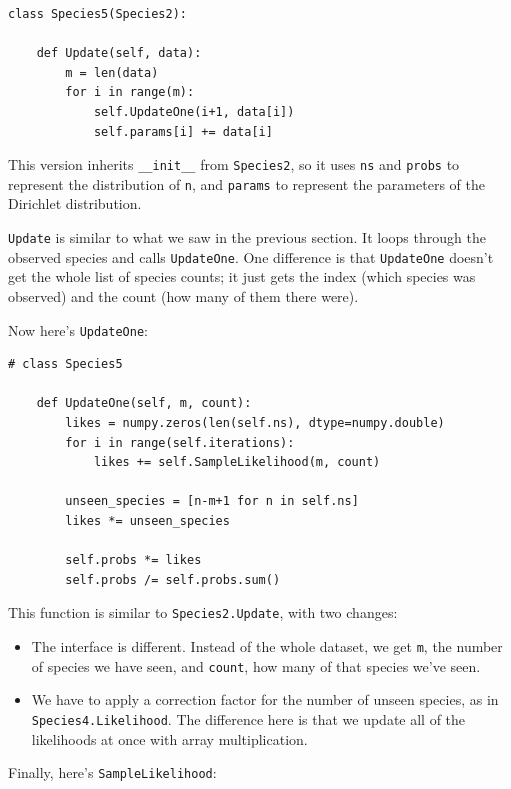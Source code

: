 \documentclass[12pt]{book}
\begin{document}
\begin{verbatim}
class Species5(Species2):
    
    def Update(self, data):
        m = len(data)
        for i in range(m):
            self.UpdateOne(i+1, data[i])
            self.params[i] += data[i]
\end{verbatim}

This version inherits \verb"__init__" from {\tt Species2}, so
it uses {\tt ns} and {\tt probs} to represent the distribution
of {\tt n}, and {\tt params} to represent the parameters of
the Dirichlet distribution.

{\tt Update} is similar to what we saw in the previous section.
It loops through the observed species and calls {\tt UpdateOne}.
One difference is that {\tt UpdateOne} doesn't get the whole list
of species counts; it just gets the index (which species was
observed) and the count (how many of them there were).

Now here's {\tt UpdateOne}:

\begin{verbatim}
# class Species5

    def UpdateOne(self, m, count):
        likes = numpy.zeros(len(self.ns), dtype=numpy.double)
        for i in range(self.iterations):
            likes += self.SampleLikelihood(m, count)

        unseen_species = [n-m+1 for n in self.ns]
        likes *= unseen_species

        self.probs *= likes
        self.probs /= self.probs.sum()
\end{verbatim}

This function is similar to {\tt Species2.Update}, with two changes:

\begin{itemize}

\item The interface is different.  Instead of the whole dataset, we
  get {\tt m}, the number of species we have seen, and {\tt count},
  how many of that species we've seen.

\item We have to apply a correction factor for the number of unseen
  species, as in {\tt Species4.Likelihood}.  The difference here is
  that we update all of the likelihoods at once with array
  multiplication.

\end{itemize}

Finally, here's {\tt SampleLikelihood}:
\end{document}
